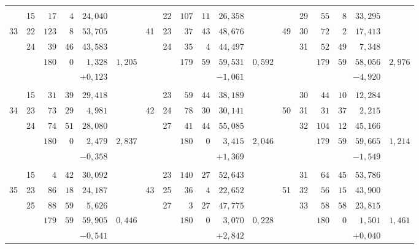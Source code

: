 \begin{center}
\begin{tabular}{|r|r|r@{\;}r@{\;}r|r||r|r|r@{\;}r@{\;}r|r||r|r|r@{\;}r@{\;}r|r|}
 &  &  &  &  &  &  &  &  &  &  &  &  &  &  &  &  & \\
 & 15 & $17$ & $4$ & $24{,}040$ &  &  & 22 & $107$ & $11$ & $26{,}358$ &  &  & 29 & $55$ & $8$ & $33{,}295$ & \\
33 & 22 & $123$ & $8$ & $53{,}705$ &  & 41 & 23 & $37$ & $43$ & $48{,}676$ &  & 49 & 30 & $72$ & $2$ & $17{,}413$ & \\
 & 24 & $39$ & $46$ & $43{,}583$ &  &  & 24 & $35$ & $4$ & $44{,}497$ &  &  & 31 & $52$ & $49$ & $7{,}348$ & \\
\cline{3-5}\cline{9-11}\cline{15-17}
 &  & $180$ & $0$ & $1{,}328$ & $1{,}205$ &  &  & $179$ & $59$ & $59{,}531$ & $0{,}592$ &  &  & $179$ & $59$ & $58{,}056$ & $2{,}976$\\
 &  & \multicolumn{3}{r|}{$+0{,}123$} &  &  &  & \multicolumn{3}{r|}{$-1{,}061$} &  &  &  & \multicolumn{3}{r|}{$-4{,}920$} & \\
 &  &  &  &  &  &  &  &  &  &  &  &  &  &  &  &  & \\
 & 15 & $31$ & $39$ & $29{,}418$ &  &  & 23 & $59$ & $44$ & $38{,}189$ &  &  & 30 & $44$ & $10$ & $12{,}284$ & \\
34 & 23 & $73$ & $29$ & $4{,}981$ &  & 42 & 24 & $78$ & $30$ & $30{,}141$ &  & 50 & 31 & $31$ & $37$ & $2{,}215$ & \\
 & 24 & $74$ & $51$ & $28{,}080$ &  &  & 27 & $41$ & $44$ & $55{,}085$ &  &  & 32 & $104$ & $12$ & $45{,}166$ & \\
\cline{3-5}\cline{9-11}\cline{15-17}
 &  & $180$ & $0$ & $2{,}479$ & $2{,}837$ &  &  & $180$ & $0$ & $3{,}415$ & $2{,}046$ &  &  & $179$ & $59$ & $59{,}665$ & $1{,}214$\\
 &  & \multicolumn{3}{r|}{$-0{,}358$} &  &  &  & \multicolumn{3}{r|}{$+1{,}369$} &  &  &  & \multicolumn{3}{r|}{$-1{,}549$} & \\
 &  &  &  &  &  &  &  &  &  &  &  &  &  &  &  &  & \\
 & 15 & $4$ & $42$ & $30{,}092$ &  &  & 23 & $140$ & $27$ & $52{,}643$ &  &  & 31 & $64$ & $45$ & $53{,}786$ & \\
35 & 23 & $86$ & $18$ & $24{,}187$ &  & 43 & 25 & $36$ & $4$ & $22{,}652$ &  & 51 & 32 & $56$ & $15$ & $43{,}900$ & \\
 & 25 & $88$ & $59$ & $5{,}626$ &  &  & 27 & $3$ & $27$ & $47{,}775$ &  &  & 33 & $58$ & $58$ & $23{,}815$ & \\
\cline{3-5}\cline{9-11}\cline{15-17}
 &  & $179$ & $59$ & $59{,}905$ & $0{,}446$ &  &  & $180$ & $0$ & $3{,}070$ & $0{,}228$ &  &  & $180$ & $0$ & $1{,}501$ & $1{,}461$\\
 &  & \multicolumn{3}{r|}{$-0{,}541$} &  &  &  & \multicolumn{3}{r|}{$+2{,}842$} &  &  &  & \multicolumn{3}{r|}{$+0{,}040$} & \\
\end{tabular}
\endgroup
\end{center}

